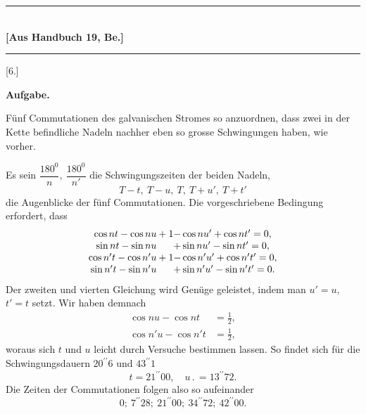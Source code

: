 \clearpage\begingroup{}
\begin{center}
\rule{.25\textwidth}{.4pt}\\
\textbf{[Aus Handbuch 19, Be.]}\\[-.3ex]
\rule{.25\textwidth}{.4pt}
\end{center}
\begin{center}[6.]\end{center}
\noindent{\small [S. 199]}
\begin{center}\textbf{Aufgabe.}\end{center}
\indent Fünf Commutationen des galvanischen Stromes so anzuordnen, dass zwei
in der Kette befindliche Nadeln nachher eben so grosse Schwingungen haben,
wie vorher.

Es sein \(\dfrac{180^0}{n},\ \dfrac{180^0}{n'}\) die Schwingungszeiten der beiden Nadeln,
\[
T-t,\ T-u,\ T,\ T+u',\ T+t'
\]
\clearpage{}
\noindent die Augenblicke der fünf Commutationen. Die vorgeschriebene Bedingung
erfordert, dass
\[
\begin{array}{r@{}c@{}l}
\cos nt-\cos nu&{}+1{}&-\cos nu'+\cos nt'=0,\\
\sin nt-\sin nu&&+\sin nu'-\sin nt'=0,\\
\cos n't-\cos n'u&{}+1{}&-\cos n'u'+\cos n't'=0,\\
\sin n't-\sin n'u&&+\sin n'u'-\sin n't'=0.
\end{array}
\]
\noindent Der zweiten und vierten Gleichung wird Genüge geleistet, indem man \(u'=u,\)
\(t'=t\) setzt. Wir haben demnach
\[
\begin{aligned}
\cos nu-\cos nt&=\tfrac12,\\
\cos n'u-\cos n't&=\tfrac12,
\end{aligned}
\]
\noindent woraus sich \(t\) und \(u\) leicht durch Versuche bestimmen lassen. So findet sich
für die Schwingungsdauern \(20^{\prime\prime}6\) und \(43^{\prime\prime}1\)
\[
t=21^{\prime\prime}00,\quad u\mathpunct{.}=13^{\prime\prime}72.
\]
\noindent Die Zeiten der Commutationen folgen also so aufeinander
\[
0;\ 7^{\prime\prime}28;\ 21^{\prime\prime}00;\ 34^{\prime\prime}72;\ 42^{\prime\prime}00.
\]
\clearpage\endgroup
